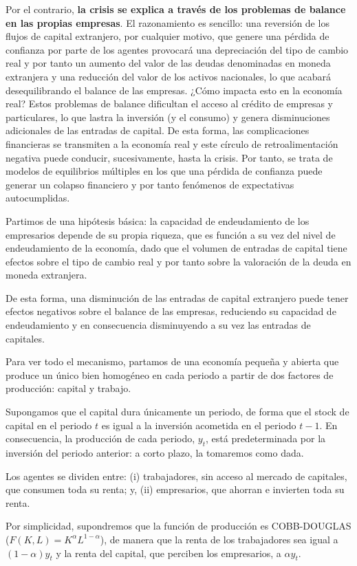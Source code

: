 \documentclass[10pt,a4paper]{article}
\begin{document}
Por el contrario, \textbf{la crisis se explica a través de los problemas de balance en las propias empresas}. El razonamiento es sencillo: una reversión de los flujos de capital extranjero, por cualquier motivo, que genere una pérdida de confianza por parte de los agentes provocará una depreciación del tipo de cambio real y por tanto un aumento del valor de las deudas denominadas en moneda extranjera y una reducción del valor de los activos nacionales, lo que acabará desequilibrando el balance de las empresas. ¿Cómo impacta esto en la economía real? Estos problemas de balance dificultan el acceso al crédito de empresas y particulares, lo que lastra la inversión (y el consumo) y genera disminuciones adicionales de las entradas de capital. De esta forma, las complicaciones financieras se transmiten a la economía real y este círculo de retroalimentación negativa puede conducir, sucesivamente, hasta la crisis. Por tanto, se trata de modelos de equilibrios múltiples en los que una pérdida de confianza puede generar un colapso financiero y por tanto fenómenos de expectativas autocumplidas.

Partimos de una hipótesis básica: la capacidad de endeudamiento de los empresarios depende de su propia riqueza, que es función a su vez del nivel de endeudamiento de la economía, dado que el volumen de entradas de capital tiene efectos sobre el tipo de cambio real y por tanto sobre la valoración de la deuda en moneda extranjera.

De esta forma, una disminución de las entradas de capital extranjero puede tener efectos negativos sobre el balance de las empresas, reduciendo su capacidad de endeudamiento y en consecuencia disminuyendo a su vez las entradas de capitales.

Para ver todo el mecanismo, partamos de una economía pequeña y abierta que produce un único bien homogéneo en cada periodo a partir de dos factores de producción: capital y trabajo.

Supongamos que el capital dura únicamente un periodo, de forma que el stock de capital en el periodo $t$ es igual a la inversión acometida en el periodo $t-1$. En consecuencia, la producción de cada periodo, $y_t$, está predeterminada por la inversión del periodo anterior: a corto plazo, la tomaremos como dada.

Los agentes se dividen entre: (i) trabajadores, sin acceso al mercado de capitales, que consumen toda su renta; y, (ii) empresarios, que ahorran e invierten toda su renta.

Por simplicidad, supondremos que la función de producción es COBB-DOUGLAS ($F(K,L)=K^\alpha L^{1-\alpha}$), de manera que la renta de los trabajadores sea igual a $(1-\alpha)y_t$ y la renta del capital, que perciben los empresarios, a $\alpha y_t$.
\end{document}
